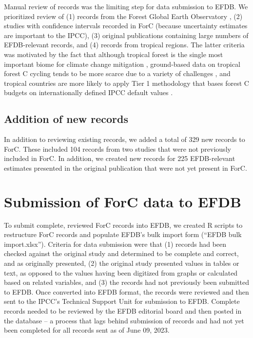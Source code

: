 \documentclass[, manuscript]{copernicus}
\begin{document}
Manual review of records was the limiting step for data submission to
EFDB. We prioritized review of (1) records from the Forest Global Earth
Observatory
\citep[ForestGEO,][]{anderson-teixeira_ctfsforestgeo_2015, davies_forestgeo_2021},
(2) studies with confidence intervals recorded in ForC (because
uncertainty estimates are important to the IPCC), (3) original
publications containing large numbers of EFDB-relevant records, and (4)
records from tropical regions. The latter criteria was motivated by the
fact that although tropical forest is the single most important biome
for climate change mitigation
\citep{griscom_natural_2017, griscom_national_2020}, ground-based data
on tropical forest C cycling tends to be more scarce due to a variety of
challenges \citep{anderson-teixeira_carbon_2021, delima_making_2022},
and tropical countries are more likely to apply Tier 1 methodology that
bases forest C budgets on internationally defined IPCC default values
\citep{romijn_assessing_2015}.

\subsection{Addition of new records}

In addition to reviewing existing records, we added a total of 329 new
records to ForC. These included 104 records from two studies
\citep{piponiot_distribution_2022, lutz_largediameter_2021} that were
not previously included in ForC. In addition, we created new records for
225 EFDB-relevant estimates presented in the original publication that
were not yet present in ForC.

\section{Submission of ForC data to EFDB}

To submit complete, reviewed ForC records into EFDB, we created R
scripts to restructure ForC records and populate EFDB's bulk import form
(``EFDB bulk import.xlsx''). Criteria for data submission were that (1)
records had been checked against the original study and determined to be
complete and correct, and as originally presented, (2) the original
study presented values in tables or text, as opposed to the values
having been digitized from graphs or calculated based on related
variables, and (3) the records had not previously been submitted to
EFDB. Once converted into EFDB format, the records were reviewed and
then sent to the IPCC's Technical Support Unit for submission to EFDB.
Complete records needed to be reviewed by the EFDB editorial board and
then posted in the database -- a process that lags behind submission of
records and had not yet been completed for all records sent as of June
09, 2023.
\end{document}
